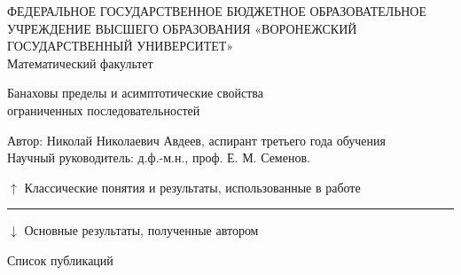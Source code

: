 \documentclass[a4paper,openbib]{report}
\theoremstyle{definition}
\begin{document}
\thispagestyle{empty}
	\Large
	\begin{center}
		ФЕДЕРАЛЬНОЕ ГОСУДАРСТВЕННОЕ БЮДЖЕТНОЕ ОБРАЗОВАТЕЛЬНОЕ
		УЧРЕЖДЕНИЕ ВЫСШЕГО ОБРАЗОВАНИЯ
		«ВОРОНЕЖСКИЙ ГОСУДАРСТВЕННЫЙ УНИВЕРСИТЕТ»
		\\
		Математический факультет
	\end{center}
	\begin{center}
		\Huge
		Банаховы пределы и асимптотические свойства \\ ограниченных последовательностей
	\end{center}
	Автор: Николай Николаевич Авдеев, аспирант третьего года обучения
	\\
	Научный руководитель: д.ф.-м.н., проф. Е. М. Семенов.
	\\
	\nocite{avdeev2021subsets,our-mz2021linearhulls}
	\nocite{*}

	\noindent
	

	\qquad$\uparrow$ Классические понятия и результаты, использованные в работе
	\hrule
	\qquad$\downarrow$ Основные результаты, полученные автором

	\vfill
	\begin{center}
		Список публикаций
	\end{center}

	\renewcommand{\section}[2]{}%
	\renewcommand{\chapter}[2]{}%
	\printbibliography{}
\end{document}
